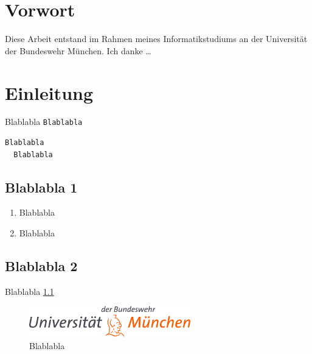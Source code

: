 \chapter*{Vorwort}

Diese Arbeit entstand im Rahmen meines Informatikstudiums an der Universit\"at 
der Bundeswehr M\"unchen. Ich danke \ldots

\chapter{Einleitung}

Blablabla {\tt Blablabla} \cite{bib_1}

\begin{verbatim} 
Blablabla
  Blablabla
\end{verbatim} 


\section{Blablabla 1}

\begin{enumerate}
\item{Blablabla}
\item{Blablabla}
\end{enumerate}


\section{Blablabla 2}

Blablabla \ref{pict_1}

\begin{figure}
\centerline{\includegraphics[width=7cm]{pics/athene.png}}
\caption{Blablabla}
\label{pict_1}
\end{figure}
